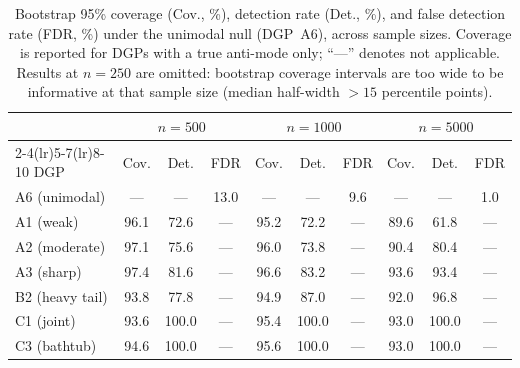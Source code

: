 \clearpage
\begin{table}[p]
\centering
\caption{Bootstrap 95\% coverage (Cov., \%), detection rate (Det., \%),
and false detection rate (FDR, \%) under the unimodal null (DGP~A6),
across sample sizes.  Coverage is reported for DGPs with a true
anti-mode only; ``---'' denotes not applicable.
Results at $n=250$ are omitted: bootstrap coverage intervals are too
wide to be informative at that sample size (median half-width
${>}15$ percentile points).}
\label{tab:coverage}
\begin{tabular}{lccccccccc}
\toprule
 & \multicolumn{3}{c}{$n=500$} & \multicolumn{3}{c}{$n=1000$} & \multicolumn{3}{c}{$n=5000$}\\
\cmidrule(lr){2-4}\cmidrule(lr){5-7}\cmidrule(lr){8-10}
DGP & Cov. & Det. & FDR & Cov. & Det. & FDR & Cov. & Det. & FDR\\
\midrule
A6 (unimodal) & --- & --- & 13.0 & --- & --- & 9.6 & --- & --- & 1.0\\
A1 (weak) & 96.1 & 72.6 & --- & 95.2 & 72.2 & --- & 89.6 & 61.8 & ---\\
A2 (moderate) & 97.1 & 75.6 & --- & 96.0 & 73.8 & --- & 90.4 & 80.4 & ---\\
A3 (sharp) & 97.4 & 81.6 & --- & 96.6 & 83.2 & --- & 93.6 & 93.4 & ---\\
B2 (heavy tail) & 93.8 & 77.8 & --- & 94.9 & 87.0 & --- & 92.0 & 96.8 & ---\\
C1 (joint) & 93.6 & 100.0 & --- & 95.4 & 100.0 & --- & 93.0 & 100.0 & ---\\
C3 (bathtub) & 94.6 & 100.0 & --- & 95.6 & 100.0 & --- & 93.0 & 100.0 & ---\\
\bottomrule
\end{tabular}
\end{table}
